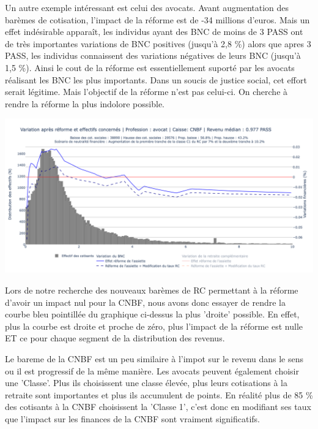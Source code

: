 Un autre exemple intéressant est celui des avocats. Avant augmentation des barèmes de cotisation, l'impact de la réforme est de -34 millions d'euros. Mais un effet indésirable apparaît, les individus ayant des BNC de moins de 3 PASS ont de très importantes variations de BNC positives (jusqu'à 2,8 \%) alors que apres 3 PASS, les individus connaissent des variations négatives de leurs BNC (jusqu'à 1,5 \%). Ainsi le cout de la réforme est essentiellement suporté par les avocats réalisant les BNC les plus importants. Dans un soucis de justice social, cet effort serait légitime. Mais l'objectif de la réforme n'est pas celui-ci. On cherche à rendre la réforme la plus indolore possible. 

\begin{center}
	\includegraphics[scale=0.38]{figures/chap2/CNBFvariations.png}
\end{center}

Lors de notre recherche des nouveaux barèmes de RC permettant à la réforme d'avoir un impact nul pour la CNBF, nous avons donc essayer de rendre la courbe bleu pointillée du graphique ci-dessus la plus 'droite' possible. En effet, plus la courbe est droite et proche de zéro, plus l'impact de la réforme est nulle ET ce pour chaque segment de la distribution des revenus.

Le bareme de la CNBF est un peu similaire à l'impot sur le revenu dans le sens ou il est progressif de la même manière. Les avocats peuvent également choisir une 'Classe'. Plus ils choisissent une classe élevée, plus leurs cotisations à la retraite sont importantes et plus ils accumulent de points. En réalité plus de 85 \% des cotisants à la CNBF choisissent la 'Classe 1', c'est donc en modifiant ses taux que l'impact sur les finances  de la CNBF sont vraiment significatifs.


